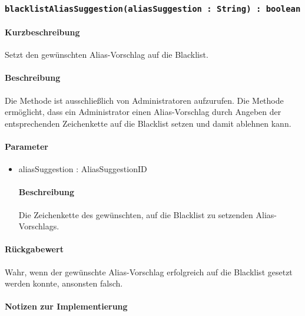 \subsubsection{\texttt{blacklistAliasSuggestion(aliasSuggestion : String) : boolean}}%
\paragraph*{Kurzbeschreibung}
Setzt den gewünschten Alias-Vorschlag auf die Blacklist.
\paragraph*{Beschreibung}
Die Methode ist ausschließlich von Administratoren aufzurufen.
Die Methode ermöglicht, dass ein Administrator einen Alias-Vorschlag durch Angeben der entsprechenden Zeichenkette auf die Blacklist setzen und damit ablehnen kann.
\paragraph*{Parameter}
\begin{itemize}
	\item aliasSuggestion : AliasSuggestionID
		\paragraph*{Beschreibung}
		Die Zeichenkette des gewünschten, auf die Blacklist zu setzenden Alias-Vorschlags.
\end{itemize}
\paragraph*{Rückgabewert}
Wahr, wenn der gewünschte Alias-Vorschlag erfolgreich auf die Blacklist gesetzt werden konnte, ansonsten falsch.

\paragraph*{Notizen zur Implementierung}%
